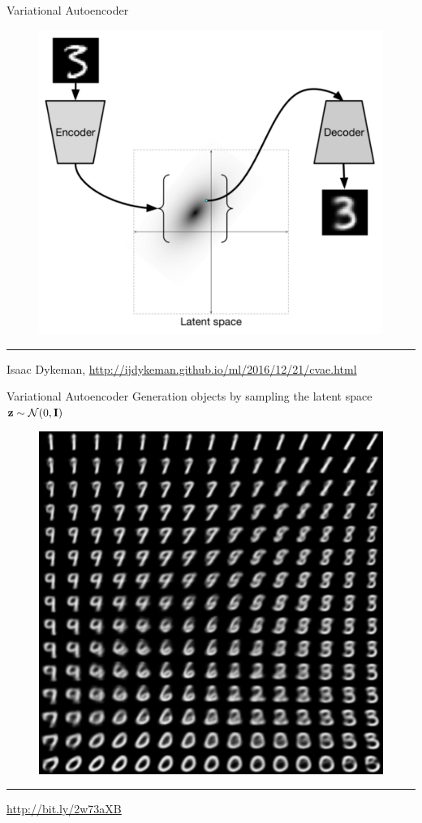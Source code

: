 \begin{frame}{Variational Autoencoder}
\begin{figure}[h]
	\centering
	\includegraphics[width=.7\linewidth]{figs/VAE.png}
\end{figure}

\medskip\hrule\medskip
{\scriptsize Isaac Dykeman, \href{http://ijdykeman.github.io/ml/2016/12/21/cvae.html}{http://ijdykeman.github.io/ml/2016/12/21/cvae.html}}
\end{frame}
\begin{frame}{Variational Autoencoder}
Generation objects by sampling the latent space $\mathbf{z} \sim \mathcal{N}(0, \mathbf{I})$
\begin{figure}[h]
	\centering
	\includegraphics[width=.5\linewidth]{figs/vae_0.png}
\end{figure}
\vfill
\hrule\medskip
{\scriptsize \href{http://bit.ly/2w73aXB}{http://bit.ly/2w73aXB}}
\end{frame}
